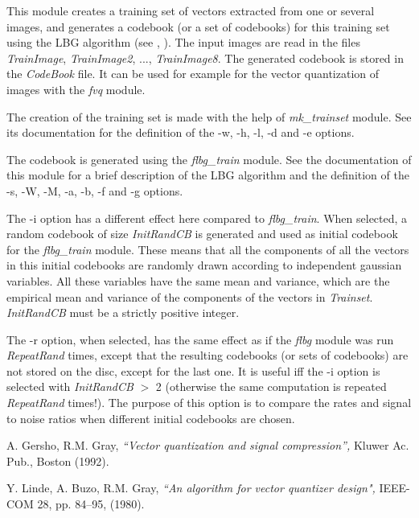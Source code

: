 This module creates a training set of vectors extracted from one or several 
images, and generates a codebook (or a set of codebooks) 
for this training set using the LBG algorithm (see \cite{kn:lbg}, 
\cite{kn:gg}). The input images are read 
in the files {\em TrainImage}, {\em TrainImage2}, ..., {\em TrainImage8}. 
The generated codebook is stored in the {\em CodeBook} file. 
It can be used for example for the vector quantization of images 
with the {\em fvq} module. 

The creation of the training set is made with the help of {\em mk\_trainset} 
module. See its documentation for the definition of the -w, -h, -l, -d and -e 
options. 

The codebook is generated using the {\em flbg\_train} module. See the 
documentation of this module for a brief description of the LBG algorithm 
and the definition of the -s, -W, -M, -a, -b, -f and -g options. 

The -i option has a different effect here compared to {\em flbg\_train}. 
When selected, a random codebook of size {\em InitRandCB} is generated 
and used as initial codebook for the {\em flbg\_train} module. 
These means that all the components of all the vectors in this initial 
codebooks are randomly drawn according to independent gaussian variables. 
All these variables have the same mean and variance, which are the 
empirical mean and variance of the components of the vectors 
in {\em Trainset}. {\em InitRandCB} must be a strictly positive integer. 

The -r option, when selected, has the same effect as if the {\em flbg} 
module was run {\em RepeatRand} times, except that the resulting 
codebooks (or sets of codebooks) are not stored on the disc, 
except for the last one. 
It is useful iff the -i option is selected with {\em InitRandCB} $>$ 2 
(otherwise the same computation is repeated {\em RepeatRand} times!). 
The purpose of this option is to compare the rates and signal to noise ratios 
when different initial codebooks are chosen.


\begin{thebibliography}{999999}

 A. Gersho, R.M. Gray, {\em ``Vector quantization 
and signal compression'', } Kluwer Ac. Pub., Boston (1992). 

 Y. Linde, A. Buzo, R.M. Gray, {\em ``An algorithm for 
vector quantizer design", } IEEE-COM 28, pp. 84--95, (1980).

\end{thebibliography}
